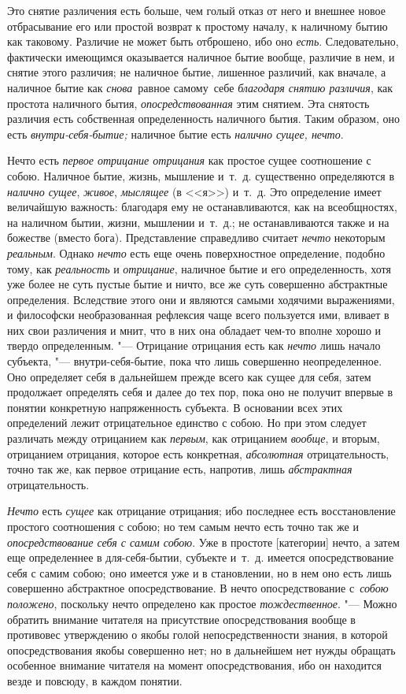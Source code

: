 Это снятие различения есть больше, чем голый отказ от него и внешнее новое
отбрасывание его или простой возврат к простому началу, к наличному бытию как
таковому. Различие не может быть отброшено, ибо оно {\em есть}. Следовательно,
фактически имеющимся оказывается наличное бытие вообще, различие в нем,
и снятие этого различия; не наличное бытие, лишенное различий, как вначале,
а наличное бытие как {\em снова}~равное самому~себе
{\em благодаря снятию различия}, как простота наличного бытия,
{\em опосредствованная} этим снятием. Эта снятость различия есть
собственная определенность наличного бытия. Таким образом, оно есть
{\em внутри-себя-бытие;} наличное бытие есть {\em налично сущее, нечто}.

Нечто есть {\em первое отрицание отрицания} как простое
сущее соотношение с собою. Наличное бытие, жизнь, мышление и~т.~д.
существенно определяются в {\em налично сущее},
{\em живое}, {\em мыслящее} (в <<я>>)
и~т.~д. Это определение имеет величайшую важность: благодаря ему не
останавливаются, как на всеобщностях, на наличном бытии, жизни, мышлении
и~т.~д.; не останавливаются также и на божестве (вместо бога).
Представление справедливо считает {\em нечто} некоторым
{\em реальным}. Однако {\em нечто}
есть еще очень поверхностное определение, подобно тому, как
{\em реальность} и {\em отрицание},
наличное бытие и его определенность, хотя уже более не суть пустые бытие и
ничто, все же суть совершенно абстрактные определения. Вследствие этого они
и являются самыми ходячими выражениями, и философски необразованная
рефлексия чаще всего пользуется ими, вливает в них свои различения и мнит,
что в них она обладает чем-то вполне хорошо и твердо определенным. "---
Отрицание отрицания есть как {\em нечто} лишь начало
субъекта, "--- внутри-себя-бытие, пока что лишь совершенно неопределенное. Оно
определяет себя в дальнейшем прежде всего как сущее для себя, затем
продолжает определять себя и далее до тех пор, пока оно не получит впервые
в понятии конкретную напряженность субъекта. В основании всех этих
определений лежит отрицательное единство с собою. Но при этом следует
различать между отрицанием как {\em первым}, как
отрицанием {\em вообще}, и вторым, отрицанием
отрицания, которое есть конкретная, {\em абсолютная}
отрицательность, точно так же, как первое отрицание есть, напротив, лишь
{\em абстрактная} отрицательность.

{\em Нечто} есть {\em сущее} как отрицание отрицания; ибо последнее есть
восстановление простого соотношения с собою; но тем самым нечто есть точно так
же и {\em опосредствование себя с самим собою}. Уже в простоте [категории]
нечто, а затем еще определеннее в для-себя-бытии, субъекте и~т.~д. имеется
опосредствование себя с самим собою; оно имеется уже и в становлении, но в нем
оно есть лишь совершенно абстрактное опосредствование. В нечто опосредствование
с~{\em собою положено}, поскольку нечто определено как простое
{\em тождественное}. "--- Можно обратить внимание читателя на присутствие
опосредствования вообще в противовес утверждению о якобы голой
непосредственности знания, в которой опосредствования якобы совершенно нет; но
в дальнейшем нет нужды обращать особенное внимание читателя на момент
опосредствования, ибо он находится везде и повсюду, в каждом понятии.

